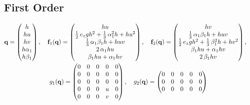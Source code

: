 \documentclass{article}
\begin{document}
    \subsection{First Order}

      \begin{gather}
        \mathbf{q} =
        \begin{pmatrix}
          h \\
          hu \\
          hv \\
          h \alpha_1 \\
          h \beta_1
        \end{pmatrix}, \quad
        \mathbf{f}_1(\mathbf{q}) =
        \begin{pmatrix}
          h u \\
          \frac{1}{2} \, e_{z} g h^{2} + \frac{1}{3} \, \alpha_{1}^{2} h + h u^{2} \\
          \frac{1}{3} \, \alpha_{1} \beta_{1} h + h u v \\
          2 \, \alpha_{1} h u \\
          \beta_{1} h u + \alpha_{1} h v
        \end{pmatrix}, \quad
        \mathbf{f}_2(\mathbf{q}) =
        \begin{pmatrix}
          h v \\
          \frac{1}{3} \, \alpha_{1} \beta_{1} h + h u v \\
          \frac{1}{2} \, e_{z} g h^{2} + \frac{1}{3} \, \beta_{1}^{2} h + h v^{2} \\
          \beta_{1} h u + \alpha_{1} h v \\
          2 \, \beta_{1} h v
        \end{pmatrix}, \quad \\
        g_1(\mathbf{q}) =
        \begin{pmatrix}
          0 & 0 & 0 & 0 & 0 \\
          0 & 0 & 0 & 0 & 0 \\
          0 & 0 & 0 & 0 & 0 \\
          0 & 0 & 0 & u & 0 \\
          0 & 0 & 0 & v & 0
        \end{pmatrix}, \quad
        g_2(\mathbf{q}) =
        \begin{pmatrix}
          0 & 0 & 0 & 0 & 0 \\
          0 & 0 & 0 & 0 & 0 \\
          0 & 0 & 0 & 0 & 0 \\

\end{pmatrix}
\end{gather}
\end{document}

